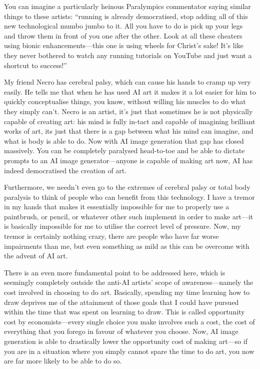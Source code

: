 \documentclass[11pt]{article}
\begin{document}
You can imagine a particularly heinous Paralympics commentator saying similar things to these artists: ``running is already democratised, stop adding all of this new technological mumbo jumbo to it. All you have to do is pick up your legs and throw them in front of you one after the other. Look at all these cheaters using bionic enhancements---this one is using wheels for Christ's sake! It's like they never bothered to watch any running tutorials on YouTube and just want a shortcut to success!''

My friend Necro has cerebral palsy, which can cause his hands to cramp up very easily. He tells me that when he has used AI art it makes it a lot easier for him to quickly conceptualise things, you know, without willing his muscles to do what they simply can't. Necro is an artist, it's just that sometimes he is not physically capable of creating art: his mind is fully in-tact and capable of imagining brilliant works of art, its just that there is a gap between what his mind can imagine, and what is body is able to do. Now with AI image generation that gap has closed massively. You can be completely paralysed head-to-toe and be able to dictate prompts to an AI image generator---anyone is capable of making art now, AI has indeed democratised the creation of art.

Furthermore, we needn't even go to the extremes of cerebral palsy or total body paralysis to think of people who can benefit from this technology. I have a tremor in my hands that makes it essentially impossible for me to properly use a paintbrush, or pencil, or whatever other such implement in order to make art---it is basically impossible for me to utilise the correct level of pressure. Now, my tremor is certainly nothing crazy, there are people who have far worse impairments than me, but even something as mild as this can be overcome with the advent of AI art.

There is an even more fundamental point to be addressed here, which is seemingly completely outside the anti-AI artists' scope of awareness---namely the cost involved in choosing to do art. Basically, spending my time learning how to draw deprives me of the attainment of those goals that I could have pursued within the time that was spent on learning to draw. This is called opportunity cost by economists---every single choice you make involves such a cost, the cost of everything that you forego in favour of whatever you choose. Now, AI image generation is able to drastically lower the opportunity cost of making art---so if you are in a situation where you simply cannot spare the time to do art, you now are far more likely to be able to do so.
\end{document}

